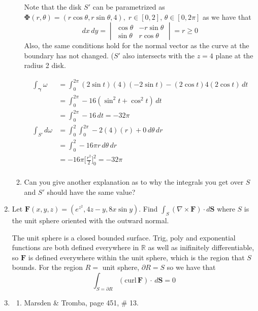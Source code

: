 \documentclass{article}
\begin{document}
\begin{enumerate}
\begin{enumerate}
            Note that the disk $S'$ can be parametrized as $\boldsymbol \Phi
            (r, \theta) = (r \cos \theta, r \sin \theta, 4),\; r \in [0,2],\,
            \theta \in [0,2\pi]$ as we have that
            \[ dx\, dy = \begin{vmatrix} \cos \theta & -r\sin \theta \\ 
            \sin \theta & r \cos \theta \end{vmatrix} = r \geq 0 \] 
            Also, the same conditions hold for the normal vector as the curve
            at the boundary has not changed. ($S'$ also intersects with the 
            $z=4$ plane at the radius 2 disk.

            \begin{align*}
                \int_{\boldsymbol \gamma} \omega &= \int_0^{2\pi} 
                (2\sin t)(4)(-2\sin t) - (2\cos t)4(2\cos t) \, dt \\
                &= \int_0^{2\pi}  -16(\sin ^2 t + \cos ^2 t) \, dt \\
                &= \int_0^{2\pi} -16 \, dt  = -32 \pi\\
                \int_{S'} d \omega &= \int_0^2 \int_0^{2\pi} -2(4)(r) + 0 \,
                d\theta \, dr \\
                &= \int_0^2 -16 \pi r \, d\theta \, dr \\
                &= -16 \pi \bigg[ \frac{r^2}{2} \bigg]_0^2 = -32 \pi \\
            \end{align*} 

        \item Can you give another explanation as to why the integrals you 
        get over $S$ and $S'$ should have the same value?

    \end{enumerate}
    
    \newpage
    \item Let $\boldsymbol F (x,y,z) = (e^{z^2}, 4z-y, 8x \sin y)$. 
    Find $\displaystyle \int_S (\nabla \times \boldsymbol F)\cdot d\boldsymbol 
    S$ where $S$ is the unit sphere oriented with the outward normal.

    The unit sphere is a closed bounded surface. Trig, poly and exponential 
    functions are both defined everywhere in $\mathbb{R}$ as well as
    inifinitely differentiable, so $\boldsymbol F$ is defined everywhere
    within the unit sphere, which is the region that $S$ bounds. For the
    region $R =$ unit sphere, $\partial R = S$ so we have that
        \[\int_{S = \partial R} (\text{curl}\, \boldsymbol F)\cdot
        \, d \boldsymbol S = 0 \]
    \newpage
    \item 
    \begin{enumerate}
        \item Marsden \& Tromba, page 451, \# 13.


\end{enumerate}
\end{enumerate}
\end{document}
